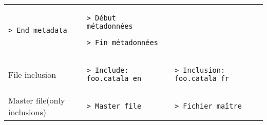 \documentclass[a3paper,landscape]{article}
\begin{document}
\begin{multicols*}{2}
\begin{center}
\begin{tabular}{p{}p{}p{}}
\begin{verbatim}
> End metadata
\end{verbatim}
\vspace*{-1.7em}
&
\vspace*{-1.7em}
\begin{verbatim}
> Début métadonnées

> Fin métadonnées
\end{verbatim}
\vspace*{-1.7em}
\\
File inclusion&
\vspace*{-1.7em}
\begin{verbatim}
> Include: foo.catala_en
\end{verbatim}
\vspace*{-1.7em}
&
\vspace*{-1.7em}
\begin{verbatim}
> Inclusion: foo.catala_fr
\end{verbatim}
\vspace*{-1.7em}
\\
Master file\newline (only inclusions)&
\vspace*{-1.7em}
\begin{verbatim}
> Master file
\end{verbatim}
\vspace*{-1.7em}
&
\vspace*{-1.7em}
\begin{verbatim}
> Fichier maître
\end{verbatim}
\vspace*{-1.7em}
\\
\bottomrule
\end{tabular}
\end{center}
\newcommand*\FancyVerbStartString{```catala}
\newcommand*\FancyVerbStopString{```}















\end{multicols*}
\end{document}
